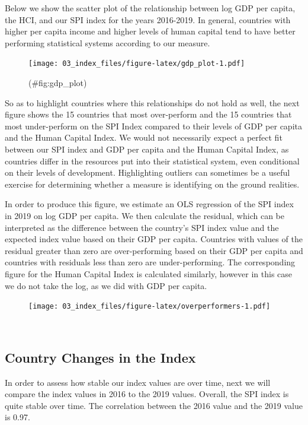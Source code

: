 \documentclass[
]{article}
\begin{document}
Below we show the scatter plot of the relationship between log GDP per capita, the HCI, and our SPI index for the years 2016-2019. In general, countries with higher per capita income and higher levels of human capital tend to have better performing statistical systems according to our measure.

\begin{figure}
\centering
\texttt{[image: 03\_index\_files/figure-latex/gdp\_plot-1.pdf]}
\caption{(\#fig:gdp\_plot)~}
\end{figure}

So as to highlight countries where this relationships do not hold as well, the next figure shows the 15 countries that most over-perform and the 15 countries that most under-perform on the SPI Index compared to their levels of GDP per capita and the Human Capital Index. We would not necessarily expect a perfect fit between our SPI index and GDP per capita and the Human Capital Index, as countries differ in the resources put into their statistical system, even conditional on their levels of development. Highlighting outliers can sometimes be a useful exercise for determining whether a measure is identifying on the ground realities.

In order to produce this figure, we estimate an OLS regression of the SPI index in 2019 on log GDP per capita. We then calculate the residual, which can be interpreted as the difference between the country's SPI index value and the expected index value based on their GDP per capita. Countries with values of the residual greater than zero are over-performing based on their GDP per capita and countries with residuals less than zero are under-performing. The corresponding figure for the Human Capital Index is calculated similarly, however in this case we do not take the log, as we did with GDP per capita.

\begin{figure}
\centering
\texttt{[image: 03\_index\_files/figure-latex/overperformers-1.pdf]}
\caption{\label{fig:overperformers}~}
\end{figure}

\hypertarget{country-changes-in-the-index}{%
\subsection{Country Changes in the Index}\label{country-changes-in-the-index}}

In order to assess how stable our index values are over time, next we will compare the index values in 2016 to the 2019 values. Overall, the SPI index is quite stable over time. The correlation between the 2016 value and the 2019 value is 0.97.
\end{document}
